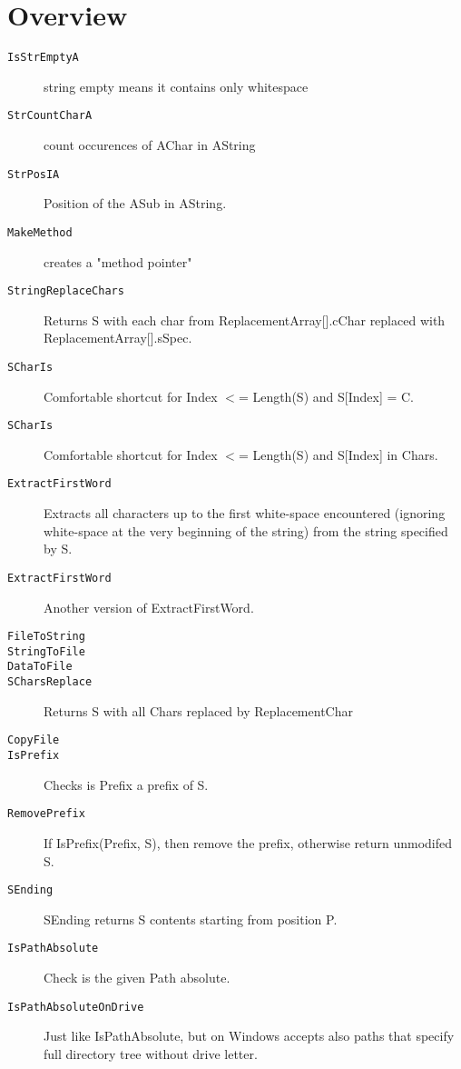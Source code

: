 \documentclass{report}
\begin{document}
\section{Overview}
\begin{description}
\item[\texttt{\begin{ttfamily}TCharReplacement\end{ttfamily} Record}]
\end{description}
\begin{description}
\item[\texttt{IsStrEmptyA}]string empty means it contains only whitespace
\item[\texttt{StrCountCharA}]count occurences of AChar in AString
\item[\texttt{StrPosIA}]Position of the ASub in AString.
\item[\texttt{MakeMethod}]creates a "method pointer"
\item[\texttt{StringReplaceChars}]Returns S with each char from ReplacementArray[].cChar replaced with ReplacementArray[].sSpec.
\item[\texttt{SCharIs}]Comfortable shortcut for Index {$<$}= Length(S) and S[Index] = C.
\item[\texttt{SCharIs}]Comfortable shortcut for Index {$<$}= Length(S) and S[Index] in Chars.
\item[\texttt{ExtractFirstWord}]Extracts all characters up to the first white{-}space encountered (ignoring white{-}space at the very beginning of the string) from the string specified by S.
\item[\texttt{ExtractFirstWord}]Another version of ExtractFirstWord.
\item[\texttt{FileToString}]
\item[\texttt{StringToFile}]
\item[\texttt{DataToFile}]
\item[\texttt{SCharsReplace}]Returns S with all Chars replaced by ReplacementChar
\item[\texttt{CopyFile}]
\item[\texttt{IsPrefix}]Checks is Prefix a prefix of S.
\item[\texttt{RemovePrefix}]If IsPrefix(Prefix, S), then remove the prefix, otherwise return unmodifed S.
\item[\texttt{SEnding}]SEnding returns S contents starting from position P.
\item[\texttt{IsPathAbsolute}]Check is the given Path absolute.
\item[\texttt{IsPathAbsoluteOnDrive}]Just like IsPathAbsolute, but on Windows accepts also paths that specify full directory tree without drive letter.

\end{description}
\end{document}
